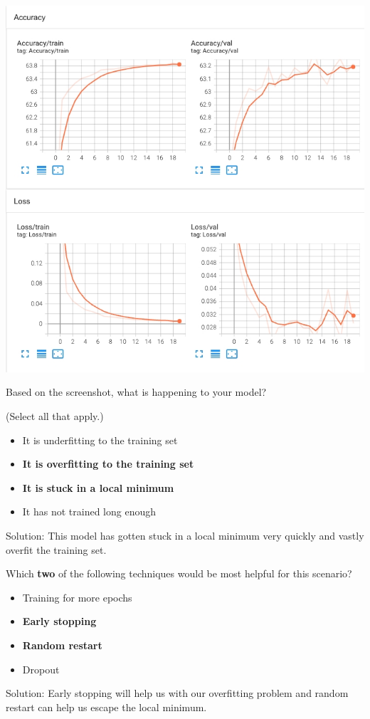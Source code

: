 \includegraphics[width=1\linewidth]{img//intro//trainingNN/screen-shot-2022-04-10-at-7.01.14-am.jpeg}

Based on the screenshot, what is happening to your model?

(Select all that apply.)

\begin{itemize}
    \item It is underfitting to the training set
    \item \textbf{It is overfitting to the training set}
    \item \textbf{It is stuck in a local minimum}
    \item It has not trained long enough
\end{itemize}
Solution: This model has gotten stuck in a local minimum very quickly and vastly overfit the training set.

Which \textbf{two} of the following techniques would be most helpful for this scenario?
\begin{itemize}
    \item Training for more epochs
    \item \textbf{Early stopping}
    \item \textbf{Random restart}
    \item Dropout
\end{itemize}
Solution: Early stopping will help us with our overfitting problem and random restart can help us escape the local minimum.


